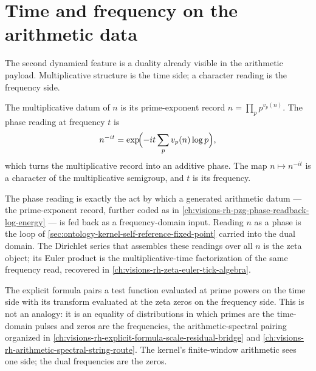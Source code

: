 \section{Time and frequency on the arithmetic data}
\label{sec:ontology-kernel-time-frequency}

The second dynamical feature is a duality already visible in the arithmetic
payload.  Multiplicative structure is the time side; a character reading is the
frequency side.

\begin{definition}
\label{def:ontology-kernel-time-frequency}
The multiplicative datum of $n$ is its prime-exponent record
$n=\prod_p p^{v_p(n)}$.  The phase reading at frequency $t$ is
$$
n^{-it}=\exp\!\Bigl(-it\sum_{p}v_p(n)\log p\Bigr),
$$
which turns the multiplicative record into an additive phase.  The map
$n\mapsto n^{-it}$ is a character of the multiplicative semigroup, and $t$ is
its frequency.
\end{definition}

\begin{principle}
\label{prin:ontology-kernel-phase-reentry}
The phase reading is exactly the act by which a generated arithmetic datum ---
the prime-exponent record, further coded as in
\autoref{ch:visions-rh-pzg-phase-readback-log-energy} --- is fed back as a
frequency-domain input.  Reading $n$ as a phase is the loop of
\autoref{sec:ontology-kernel-self-reference-fixed-point} carried into the dual
domain.  The Dirichlet series that assembles these readings over all $n$ is the
zeta object; its Euler product is the multiplicative-time factorization of the
same frequency read, recovered in
\autoref{ch:visions-rh-zeta-euler-tick-algebra}.
\end{principle}

\begin{principle}
\label{prin:ontology-kernel-explicit-formula-duality}
The explicit formula pairs a test function evaluated at prime powers on the
time side with its transform evaluated at the zeta zeros on the frequency side.
This is not an analogy: it is an equality of distributions in which primes are
the time-domain pulses and zeros are the frequencies, the arithmetic-spectral
pairing organized in
\autoref{ch:visions-rh-explicit-formula-scale-residual-bridge} and
\autoref{ch:visions-rh-arithmetic-spectral-string-route}.  The kernel's
finite-window arithmetic sees one side; the dual frequencies are the zeros.
\end{principle}

